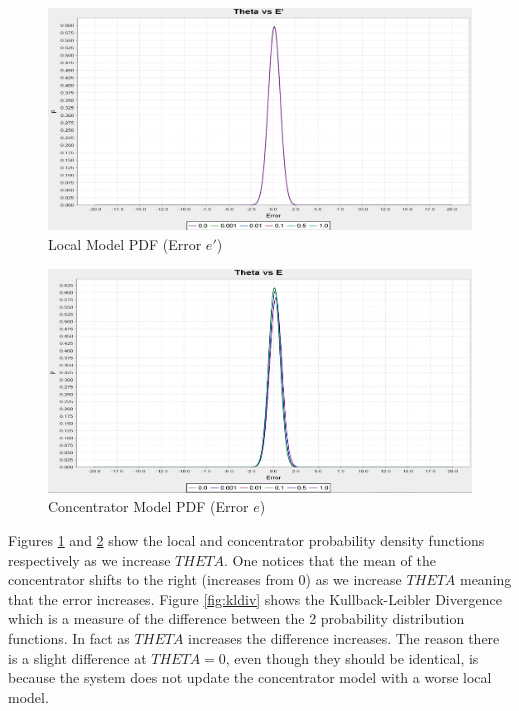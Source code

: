 \documentclass{mproj}
\begin{document}
\begin{figure}[H]
  \caption{Local Model PDF (Error $e'$)}
  \label{fig:thetaedash}
\centerline{\includegraphics[scale=0.3]{ThetaEDASH}}
\end{figure}

\begin{figure}[H]
\caption{Concentrator Model PDF (Error $e$)}
\label{fig:thetae}
\centerline{\includegraphics[scale=0.3]{ThetaE}}
\end{figure}

Figures \ref{fig:thetaedash} and \ref{fig:thetae} show the local and concentrator probability density functions respectively as we increase $THETA$. One notices that the mean of the concentrator shifts to the right (increases from 0) as we increase $THETA$ meaning that the error increases. Figure \ref{fig:kldiv} shows the Kullback-Leibler Divergence which is a measure of the difference between the 2 probability distribution functions. In fact as $THETA$ increases the difference increases. The reason there is a slight difference at $THETA=0$, even though they should be identical, is because the system does not update the concentrator model with a worse local model.
\end{document}
